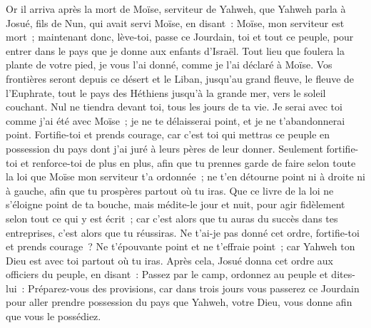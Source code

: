 \begin{multicols}{2}
\VerseOne{}Or il arriva après la mort de Moïse, serviteur de Yahweh, que Yahweh parla à Josué, fils de Nun, qui avait servi Moïse, en disant~:
Moïse, mon serviteur est mort~; maintenant donc, lève-toi, passe ce Jourdain, toi et tout ce peuple, pour entrer dans le pays que je donne aux enfants d'Israël.
Tout lieu que foulera la plante de votre pied, je vous l'ai donné, comme je l'ai déclaré à Moïse.
Vos frontières seront depuis ce désert et le Liban, jusqu'au grand fleuve, le fleuve de l'Euphrate, tout le pays des Héthiens jusqu'à la grande mer, vers le soleil couchant.
Nul ne tiendra devant toi, tous les jours de ta vie. Je serai avec toi comme j'ai été avec Moïse~; je ne te délaisserai point, et je ne t'abandonnerai point.
Fortifie-toi et prends courage, car c'est toi qui mettras ce peuple en possession du pays dont j'ai juré à leurs pères de leur donner.
Seulement fortifie-toi et renforce-toi de plus en plus, afin que tu prennes garde de faire selon toute la loi que Moïse mon serviteur t'a ordonnée~; ne t'en détourne point ni à droite ni à gauche, afin que tu prospères partout où tu iras.
Que ce livre de la loi ne s'éloigne point de ta bouche, mais médite-le jour et nuit, pour agir fidèlement selon tout ce qui y est écrit~; car c'est alors que tu auras du succès dans tes entreprises, c'est alors que tu réussiras.
Ne t'ai-je pas donné cet ordre, fortifie-toi et prends courage~? Ne t'épouvante point et ne t'effraie point~; car Yahweh ton Dieu est avec toi partout où tu iras.
Après cela, Josué donna cet ordre aux officiers du peuple, en disant~:
Passez par le camp, ordonnez au peuple et dites-lui~: Préparez-vous des provisions, car dans trois jours vous passerez ce Jourdain pour aller prendre possession du pays que Yahweh, votre Dieu, vous donne afin que vous le possédiez.

\end{multicols}
